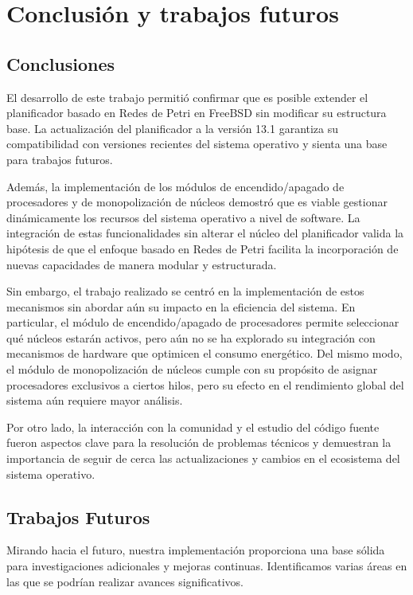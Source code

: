 \section{Conclusión y trabajos futuros}

\subsection{Conclusiones}

El desarrollo de este trabajo permitió confirmar que es posible extender el planificador basado en Redes de Petri en FreeBSD sin modificar su estructura base. La actualización del planificador a la versión 13.1 garantiza su compatibilidad con versiones recientes del sistema operativo y sienta una base para trabajos futuros.

Además, la implementación de los módulos de encendido/apagado de procesadores y de monopolización de núcleos demostró que es viable gestionar dinámicamente los recursos del sistema operativo a nivel de software. La integración de estas funcionalidades sin alterar el núcleo del planificador valida la hipótesis de que el enfoque basado en Redes de Petri facilita la incorporación de nuevas capacidades de manera modular y estructurada.

Sin embargo, el trabajo realizado se centró en la implementación de estos mecanismos sin abordar aún su impacto en la eficiencia del sistema. En particular, el módulo de encendido/apagado de procesadores permite seleccionar qué núcleos estarán activos, pero aún no se ha explorado su integración con mecanismos de hardware que optimicen el consumo energético. Del mismo modo, el módulo de monopolización de núcleos cumple con su propósito de asignar procesadores exclusivos a ciertos hilos, pero su efecto en el rendimiento global del sistema aún requiere mayor análisis.

Por otro lado, la interacción con la comunidad y el estudio del código fuente fueron aspectos clave para la resolución de problemas técnicos y demuestran la importancia de seguir de cerca las actualizaciones y cambios en el ecosistema del sistema operativo.

\subsection{Trabajos Futuros}

Mirando hacia el futuro, nuestra implementación proporciona una base sólida para investigaciones adicionales y mejoras continuas. Identificamos varias áreas en las que se podrían realizar avances significativos.

